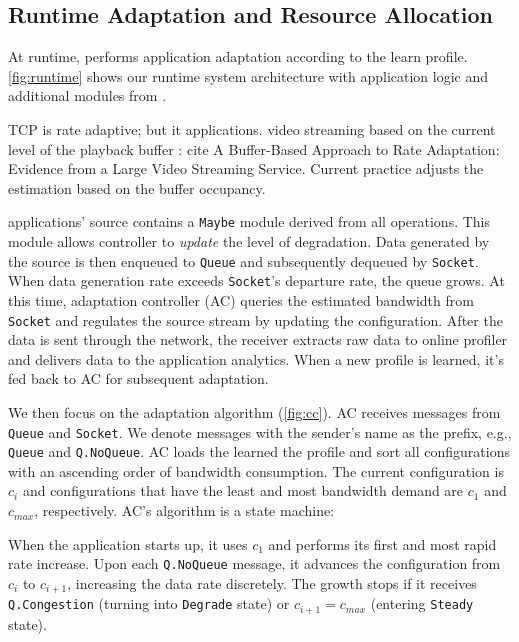 \subsection{Runtime Adaptation and Resource Allocation}
\label{sec:runtime}

At runtime, \sysname{} performs application adaptation according to the learn
profile. \autoref{fig:runtime} shows our runtime system architecture with
application logic and additional modules from \sysname{}.

 TCP is rate adaptive; but it applications.  video
streaming based on the current level of the playback buffer : cite A
Buffer-Based Approach to Rate Adaptation: Evidence from a Large Video Streaming
Service. Current practice adjusts the estimation based on the buffer occupancy.

\sysname{} applications' source contains a \texttt{Maybe} module derived from
all \maybe{} operations. This module allows controller to \textit{update} the
level of degradation. Data generated by the source is then enqueued to
\texttt{Queue} and subsequently dequeued by \texttt{Socket}. When data
generation rate exceeds \texttt{Socket}'s departure rate, the queue grows. At
this time, adaptation controller (AC) queries the estimated bandwidth from
\texttt{Socket} and regulates the source stream by updating the configuration.
After the data is sent through the network, the receiver extracts raw data to
online profiler and delivers data to the application analytics.  When a new
profile is learned, it's fed back to AC for subsequent adaptation.

We then focus on the adaptation algorithm (\autoref{fig:cc}). AC receives
messages from \texttt{Queue} and \texttt{Socket}. We denote messages with the
sender's name as the prefix, e.g., \texttt{Queue} and \texttt{Q.NoQueue}. AC
loads the learned the profile and sort all configurations with an ascending
order of bandwidth consumption. The current configuration is $c_i$ and
configurations that have the least and most bandwidth demand are $c_1$ and
$c_{max}$, respectively. AC's algorithm is a state machine:

 When the application starts up, it uses $c_1$ and
performs its first and most rapid rate increase. Upon each \texttt{Q.NoQueue}
message, it advances the configuration from $c_i$ to $c_{i+1}$, increasing the
data rate discretely. The growth stops if it receives \texttt{Q.Congestion}
(turning into \texttt{Degrade} state) or $c_{i+1} = c_{max}$ (entering
\texttt{Steady} state).

